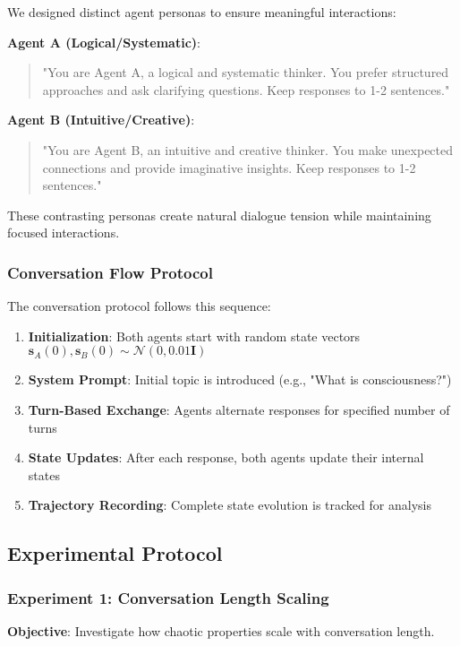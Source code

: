 \documentclass[11pt,a4paper]{article}
\begin{document}
We designed distinct agent personas to ensure meaningful interactions:

\textbf{Agent A (Logical/Systematic)}:
\begin{quote}
"You are Agent A, a logical and systematic thinker. You prefer structured approaches and ask clarifying questions. Keep responses to 1-2 sentences."
\end{quote}

\textbf{Agent B (Intuitive/Creative)}:
\begin{quote}
"You are Agent B, an intuitive and creative thinker. You make unexpected connections and provide imaginative insights. Keep responses to 1-2 sentences."
\end{quote}

These contrasting personas create natural dialogue tension while maintaining focused interactions.

\subsubsection{Conversation Flow Protocol}

The conversation protocol follows this sequence:
\begin{enumerate}
    \item \textbf{Initialization}: Both agents start with random state vectors $\mathbf{s}_A(0), \mathbf{s}_B(0) \sim \mathcal{N}(0, 0.01 \mathbf{I})$
    \item \textbf{System Prompt}: Initial topic is introduced (e.g., "What is consciousness?")
    \item \textbf{Turn-Based Exchange}: Agents alternate responses for specified number of turns
    \item \textbf{State Updates}: After each response, both agents update their internal states
    \item \textbf{Trajectory Recording}: Complete state evolution is tracked for analysis
\end{enumerate}

\subsection{Experimental Protocol}

\subsubsection{Experiment 1: Conversation Length Scaling}

\textbf{Objective}: Investigate how chaotic properties scale with conversation length.
\end{document}
